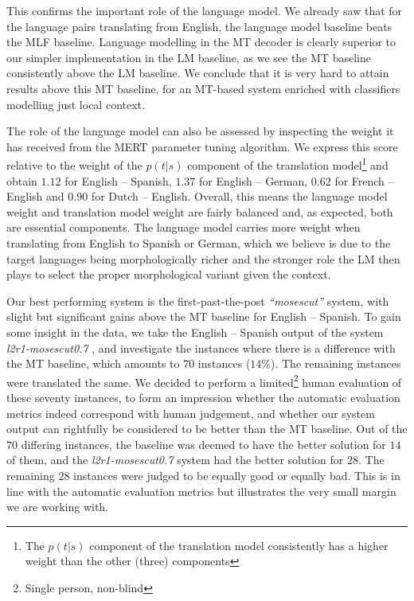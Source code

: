 This confirms the important role of the language model. We already saw
that for the language pairs translating from English, the language model
baseline beats the MLF baseline. Language modelling in the MT decoder is
clearly superior to our simpler implementation in the LM baseline, as we see
the MT baseline consistently above the LM baseline. We conclude that it is very
hard to attain results above this MT baseline, for an MT-based system enriched
with classifiers modelling just local context.

The role of the language model can also be assessed by inspecting the
weight it has received from the MERT parameter tuning algorithm. We express this
score relative to the weight of the $p(t|s)$ component of the translation
model\footnote{The $p(t|s)$ component of the translation model consistently has
a higher weight than the other (three) components} and obtain $1.12$ for
English -- Spanish, $1.37$ for English -- German, $0.62$ for French -- English
and $0.90$ for Dutch -- English. Overall, this means the language model weight
and translation model weight are fairly balanced and, as expected, both are
essential components. The language model carries more weight when
translating from English to Spanish or German, which we believe is due to the
target languages being morphologically richer and the stronger role the LM then
plays to select the proper morphological variant given the context.

Our best performing system is the first-past-the-post \emph{``mosescut''}
system, with slight but significant gains above the MT baseline for English --
Spanish. To gain some insight in the data, we take the English -- Spanish
output of the system \emph{l2r1-mosescut0.7} , and investigate the instances
where there is a difference with the MT baseline, which amounts to $70$
instances ($14\%$). The remaining instances were translated the same. We
decided to perform a limited\footnote{Single person, non-blind} human
evaluation of these seventy instances, to form an impression whether the
automatic evaluation metrics indeed correspond with human judgement, and
whether our system output can rightfully be considered to be better than the MT
baseline.  Out of the $70$ differing instances, the baseline was deemed to have
the better solution for $14$ of them, and the \emph{l2r1-mosescut0.7} system
had the better solution for $28$. The remaining $28$ instances were judged to
be equally good or equally bad. This is in line with the automatic evaluation
metrics but illustrates the very small margin we are working with.

